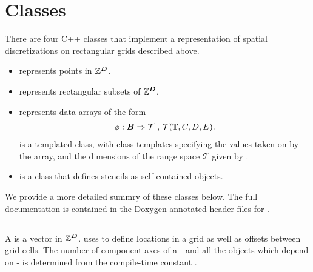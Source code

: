 \documentclass[12pt]{article}
\begin{document}
\section{\libname Classes}

There are four C++ classes that implement a representation of spatial discretizations on rectangular grids described above.
\begin{itemize}
\item
{} represents points in $\mathbb{Z}^{\boldsymbol{D}}$.
\item
{} represents rectangular subsets of $\mathbb{Z}^{\boldsymbol{D}}$.
\item
{} represents data arrays of the form
\begin{gather*}
\phi:{\boldsymbol{B}} \Rightarrow \mathcal{T} \hbox{ , } \mathcal{T}(\mathbb{T},C,D,E).
\end{gather*}
 is a templated class, with class templates specifying the values taken on by the array, and the dimensions of the range space $\mathcal{T}$ given by . 
\item
{} is a class that defines stencils as self-contained objects.
\end{itemize}
We provide a more detailed summry of these classes below. The full documentation is contained in the Doxygen-annotated header files for \libname.

\subsection{}

A  is a vector in $\mathbb{Z}^{\boldsymbol{D}}$. \libname uses  to define locations in a grid as well as offsets between grid cells. The number of component axes of a  - and all the objects which depend on  - is determined from the compile-time constant . 
\end{document}
